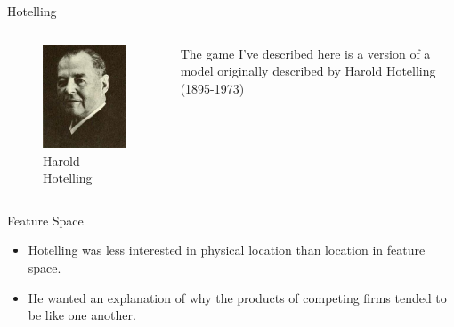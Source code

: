 \documentclass[
  14pt,
  letterpaper,
  ignorenonframetext,
  aspectratio=169,
  handout]{beamer}
\providecommand{\tightlist}{%
  \setlength{\itemsep}{0pt}\setlength{\parskip}{0pt}}\usepackage{longtable,booktabs,array}
\let\olditem\item
\renewcommand{\item}{%
\olditem\vspace{6pt}}
\begin{document}
\begin{frame}{Hotelling}
\protect\hypertarget{hotelling}{}
\begin{columns}[c]
\begin{column}{0.48\textwidth}
\begin{figure}

{\centering \includegraphics{images/hotelling.jpg}

}

\caption{Harold Hotelling}

\end{figure}
\end{column}

\begin{column}{0.48\textwidth}
The game I've described here is a version of a model originally
described by Harold Hotelling (1895-1973)
\end{column}
\end{columns}
\end{frame}

\begin{frame}{Feature Space}
\protect\hypertarget{feature-space}{}
\begin{itemize}[<+->]
\tightlist
\item
  Hotelling was less interested in physical location than location in
  feature space.
\item
  He wanted an explanation of why the products of competing firms tended
  to be like one another.
\end{itemize}
\end{frame}
\end{document}
